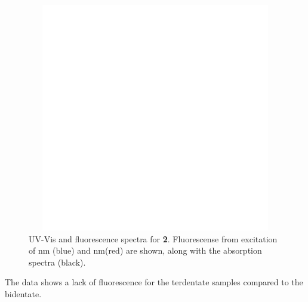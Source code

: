 \begin{figure}[!htb]
 \centering
  \includegraphics[clip=true, width=120mm, height=100mm, keepaspectratio]{images/insertgraphic.eps}
 \caption[UV-Vis and fluorescence spectra for \textbf{2}]{UV-Vis and fluorescence spectra for \textbf{2}. Fluorescense from excitation of  nm (blue) and  nm(red) are shown, along with the absorption spectra (black).}
 \label{fig.fluoro2}
\end{figure}

The data shows a lack of fluorescence for the terdentate samples compared to the bidentate. 